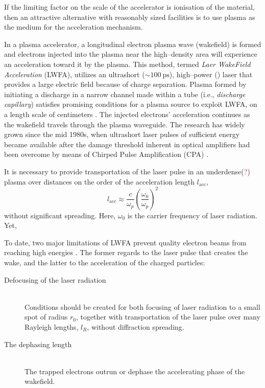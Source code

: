 \documentclass[justified,nofonts,nobib,openany]{tufte-book}
\begin{document}
If the limiting factor on the scale of the accelerator is ionisation of the material, then an attractive alternative with reasonably sized facilities is to use plasma as the medium for the acceleration mechanism.

In a plasma accelerator, a longitudinal electron plasma wave (wakefield) is formed and electrons injected into the plasma near the high--density area will experience an acceleration toward it by the plasma. This method, termed \emph{Laer WakeField Acceleration} (LWFA), utilizes an ultrashort ($\sim\SI{100}{\ps}$), high--power (\si{\TW}) laser that provides a large electric field because of charge separation. Plasma formed by initiating a discharge in a narrow channel made within a tube (i.e., \textit{discharge capillary}) satisfies promising conditions for a plasma source to exploit LWFA, on a length scale of centimeters \cite{Gonsalves2019PetawattWaveguide,Leemans2014Multi-GeVRegime}. The injected electrons' acceleration continues as the wakefield travels through the plasma waveguide. The research has widely grown since the mid 1980s, when ultrashort laser pulses of sufficient energy became available after the damage threshold inherent in optical amplifiers had been overcome by means of Chirped Pulse Amplification (CPA) \cite{Strickland1985CompressionPulses}.

It is necessary to provide transportation of the laser pulse in an underdense(\textcolor{red}{?}) plasma over distances on the order of the acceleration length $l_\text{acc}$,
\begin{equation}
    l_\text{acc}\approx\frac{c}{\omega_p}\left(\frac{\omega_0}{\omega_p}\right)^2
\end{equation}
without significant spreading. Here, $\omega_0$ is the  carrier frequency of laser radiation. Yet,

To date, two major limitations of LWFA prevent quality electron beams from reaching high energies \cite{Esarey2009PhysicsAccelerators}. The former regards to the laser pulse that creates the wake, and the latter to the acceleration of the charged particles:
\begin{description}
  \item[\textnormal{Defocusing of the laser radiation}] \hfill \\ Conditions  should be created for both focusing of laser radiation to a small spot of radius $r_0$, together with transportation of  the laser pulse over many Rayleigh lengths, $l_R$, without diffraction spreading.
  \item[\textnormal{The dephasing length}] \hfill \\ The trapped electrons outrun or dephase the accelerating phase of the wakefield.
\end{description}
\end{document}
